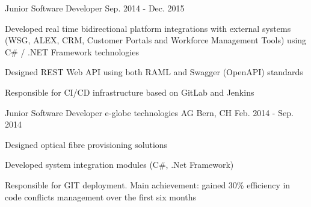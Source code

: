 \begin{cventries}
  \cventry
    {Junior Software Developer} %
    {} %
    {} %
    {Sep. 2014 - Dec. 2015} %
    {
      \begin{cvitems} %
        \item {Developed real time bidirectional platform integrations with external systems (WSG, ALEX, CRM, Customer Portals and Workforce Management Tools) using C\# / .NET Framework technologies}
        \item {Designed REST Web API using both RAML and Swagger (OpenAPI) standards}
        \item {Responsible for CI/CD infrastructure based on GitLab and Jenkins}
      \end{cvitems}
    }

\smallskip

  \cventry
    {Junior Software Developer} %
    {e-globe technologies AG} %
    {Bern, CH} %
    {Feb. 2014 - Sep. 2014} %
    {
      \begin{cvitems} %
        \item {Designed optical fibre provisioning solutions}
		\item {Developed system integration modules (C\#, .Net Framework)}
		\item {Responsible for GIT deployment. Main achievement: gained 30\% efficiency in code conflicts management over the first six months}
      \end{cvitems}
    }

\end{cventries}
